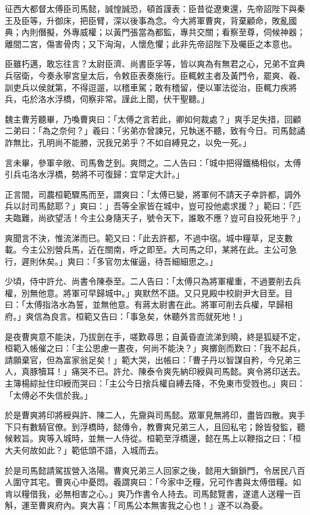 征西大都督太傅臣司馬懿，誠惶誠恐，頓首謹表：臣昔從遼東還，先帝詔陛下與秦王及臣等，升御床，把臣臂，深以後事為念。今大將軍曹爽，背棄顧命，敗亂國典；內則僭擬，外專威權；以黃門張當為都監，專共交關；看察至尊，伺候神器；離間二宮，傷害骨肉；又下洶洶，人懷危懼；此非先帝詔陛下及囑臣之本意也。

臣雖朽邁，敢忘往言？太尉臣濟、尚書臣孚等，皆以爽為有無君之心，兄弟不宜典兵宿衛，今奏永寧宮皇太后，令敕臣表奏施行。臣輒敕主者及黃門令，罷爽、羲、訓吏兵以侯就第，不得逗遛，以稽車駕；敢有稽留，便以軍法從治，臣輒力疾將兵，屯於洛水浮橋，伺察非常。謹此上聞，伏干聖聽。」

魏主曹芳聽畢，乃喚曹爽曰：「太傅之言若此，卿如何裁處？」爽手足失措，回顧二弟曰：「為之奈何？」羲曰：「劣弟亦曾諫兄，兄執迷不聽，致有今日。司馬懿譎詐無比，孔明尚不能勝，況我兄弟乎？不如自縛見之，以免一死。」

言未畢，參軍辛敞、司馬魯芝到。爽問之。二人告曰：「城中把得鐵桶相似，太傅引兵屯洛水浮橋，勢將不可復歸：宜早定大計。」

正言間，司農桓範驟馬而至，謂爽曰：「太傅已變，將軍何不請天子幸許都，調外兵以討司馬懿耶？」爽曰：」吾等全家皆在城中，豈可投他處求援？」範曰：「匹夫臨難，尚欲望活！今主公身隨天子，號令天下，誰敢不應？豈可自投死地乎？」

爽聞言不決，惟流涕而已。範又曰：「此去許都，不過中宿。城中糧草，足支數載。今主公別營兵馬，近在關南，呼之即至。大司馬之印，某將在此。主公可急行，遲則休矣。」爽曰：「多官勿太催逼，待吾細細思之。」

少頃，侍中許允、尚書令陳泰至。二人告曰：「太傅只為將軍權重，不過要削去兵權，別無他意。將軍可早歸城中。」爽默然不語。又只見殿中校尉尹大目至。目曰：「太傅指洛水為誓，並無他意。有蔣太尉書在此。將軍可削去兵權，早歸相府。」爽信為良言。桓範又告曰：「事急矣，休聽外言而就死地！」

是夜曹爽意不能決，乃拔劍在手，嗟歎尋思；自黃昏直流涕到曉，終是狐疑不定，桓範入帳催之曰：「主公思慮一晝夜，何尚不能決？」爽擲劍而歎曰：「我不起兵，請願棄官，但為富家翁足矣！」範大哭，出帳曰：「曹子丹以智謀自矜，今兄弟三人，真豚犢耳！」痛哭不已。許允、陳泰令爽先納印綬與司馬懿。爽令將印送去。主簿楊綜扯住印綬而哭曰：「主公今日捨兵權自縛去降，不免東市受戮也。」爽曰：「太傅必不失信於我。」

於是曹爽將印將綬與許、陳二人，先齎與司馬懿。眾軍見無將印，盡皆四散。爽手下只有數騎官僚。到浮橋時，懿傳令，教曹爽兄弟三人，且回私宅；餘皆發監，聽候敕旨。爽等入城時，並無一人侍從。桓範至浮橋邊，懿在馬上以鞭指之曰：「桓大夫何故如此？」範低頭不語，入城而去。

於是司馬懿請駕拔營入洛陽。曹爽兄弟三人回家之後，懿用大鎖鎖門，令居民八百人圍守其宅。曹爽心中憂悶。羲謂爽曰：「今家中乏糧，兄可作書與太傅借糧。如肯以糧借我，必無相害之心。」爽乃作書令人持去。司馬懿覽書，遂遣人送糧一百斛，運至曹爽府內。爽大喜：「司馬公本無害我之心也！」遂不以為憂。

